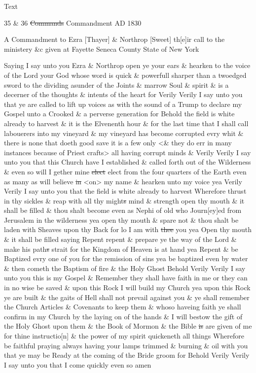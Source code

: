 			\begin{description}
				\item[Text]
			\end{description}
			
				\begin{tightcenter}
				35 \& 36 \sout{Commands} Commandment AD 1830
				\end{tightcenter}
				
				A Commandment to Ezra [Thayer] \& Northrop [Sweet] th[e]ir call to the ministery \&c given at Fayette Seneca County State of New York
				
				Saying I say unto you Ezra \& Northrop open ye your ears \& hearken to the voice of the Lord your God whose word is quick \& powerfull sharper than a twoedged sword to the dividing asunder of the Joints \& marrow Soul \& spirit \& is a decerner of the thoughts \& intents of the heart for Verily Verily I say unto you that ye are called to lift up voices as with the sound of a Trump to declare my Gospel unto a Crooked \& a perverse generation for Behold the field is white already to harvest \& it is the Elvenenth hour \& for the last time that I shall call labouerers into my vineyard \& my vineyard has become corrupted evry whit \& there is none that doeth good save it is a few only <\& they do err in many instances because of Priest crafts> all having corrupt minds \& Verily Verily I say unto you that this Church have I established \& called forth out of the Wilderness \& even so will I gether mine \sout{elect} elect from the four quarters of the Earth even as many as will believe \sout{in} <on> my name \& hearken unto my voice yea Verily Verily I say unto you that the field is white already to harvest Wherefore thrust in thy sickles \& reap with all thy might\sout{s} mind \& strength open thy mouth \& it shall be filled \& thou shalt become even as Nephi of old who Journ[ey]ed from Jerusalem in the wilderness yea open thy mouth \& spare not \& thou shalt be laden with Sheaves upon thy Back for lo I am with \sout{thee} you yea Open thy mouth \& it shall be filled saying Repent repent \& prepare ye the way of the Lord \& make his path\sout{s} strait for the Kingdom of Heaven is at hand yea Repent \& be Baptized evry one of you for the remission of sins yea be baptized even by water \& then cometh the Baptism of fire \& the Holy Ghost Behold Verily Verily I say unto you this is my Gospel \& Remember they shall have faith in me or they can in no wise be saved \& upon this Rock I will build my Church yea upon this Rock ye are built \& the gaits of Hell shall not prevail against you \& ye shall remember the Church Articles \& Covenants to keep them \& whoso haveing faith ye shall confirm in my Church by the laying on of the hands \& I will bestow the gift of the Holy Ghost upon them \& the Book of Mormon \& the Bible \sout{is} are given of me for thine instructio[n] \& the power of my spirit quickeneth all things Wherefore be faithful praying always having your lamps trimmed \& burning \& oil with you that ye may be Ready at the coming of the Bride groom for Behold Verily Verily I say unto you that I come quickly even so amen
				
